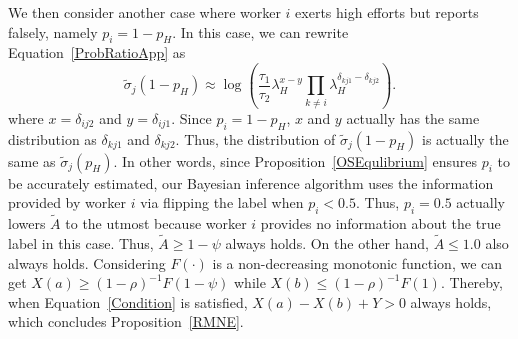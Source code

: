 We then consider another case where worker $i$ exerts high efforts but reports falsely, namely $p_i=1-p_H$. In this case, we can rewrite Equation~\ref{ProbRatioApp} as
\begin{equation}
\tilde{\sigma}_j(1-p_H)\approx \log\left(\frac{\tau_{1}}{\tau_{2}}\lambda_H^{x-y}{\prod}_{k\neq i}\lambda_H^{\delta_{kj1}-\delta_{kj2}}\right).
\end{equation}
where $x=\delta_{ij2}$ and $y=\delta_{ij1}$. Since $p_i=1-p_H$, $x$ and $y$ actually has the same distribution as $\delta_{kj1}$ and $\delta_{kj2}$. Thus, the distribution of $\tilde{\sigma}_j(1-p_H)$ is actually the same as $\tilde{\sigma}_j(p_H)$.
In other words, since Proposition~\ref{OSEqulibrium} ensures $p_i$ to be accurately estimated, our Bayesian inference algorithm uses the information provided by worker $i$ via flipping the label when $p_i<0.5$.
Thus, $p_i=0.5$ actually lowers $\tilde{A}$ to the utmost because worker $i$ provides no information about the true label in this case.
Thus, $\tilde{A}\geq 1-\psi$ always holds.
On the other hand, $\tilde{A}\leq 1.0$ also always holds.
Considering $F(\cdot)$ is a non-decreasing monotonic function, we can get $X(a)\geq (1-\rho)^{-1}F(1-\psi)$ while $X(b) \leq (1-\rho)^{-1}F(1)$.
Thereby, when Equation~\ref{Condition} is satisfied, $X(a)-X(b)+Y>0$ always holds, which concludes Proposition~\ref{RMNE}.